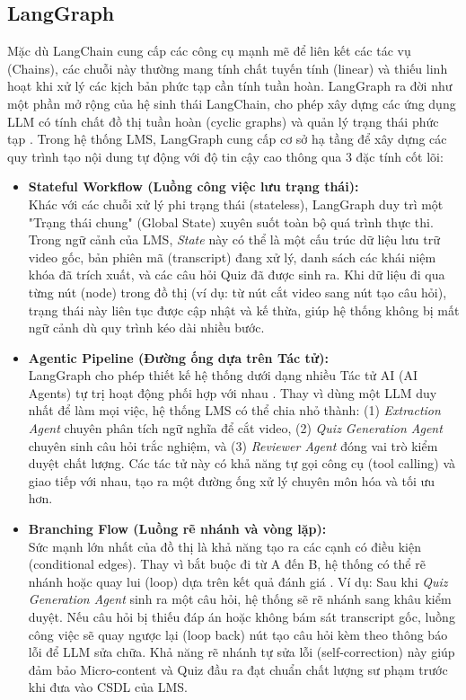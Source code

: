 \subsection{LangGraph}
Mặc dù LangChain cung cấp các công cụ mạnh mẽ để liên kết các tác vụ (Chains), các chuỗi này thường mang tính chất tuyến tính (linear) và thiếu linh hoạt khi xử lý các kịch bản phức tạp cần tính tuần hoàn. LangGraph ra đời như một phần mở rộng của hệ sinh thái LangChain, cho phép xây dựng các ứng dụng LLM có tính chất đồ thị tuần hoàn (cyclic graphs) và quản lý trạng thái phức tạp \cite{langgraph2024}. Trong hệ thống LMS, LangGraph cung cấp cơ sở hạ tầng để xây dựng các quy trình tạo nội dung tự động với độ tin cậy cao thông qua 3 đặc tính cốt lõi:

\begin{itemize}
    \item[\textbf{a.}] \textbf{Stateful Workflow (Luồng công việc lưu trạng thái):} \\
    Khác với các chuỗi xử lý phi trạng thái (stateless), LangGraph duy trì một "Trạng thái chung" (Global State) xuyên suốt toàn bộ quá trình thực thi. Trong ngữ cảnh của LMS, \textit{State} này có thể là một cấu trúc dữ liệu lưu trữ video gốc, bản phiên mã (transcript) đang xử lý, danh sách các khái niệm khóa đã trích xuất, và các câu hỏi Quiz đã được sinh ra. Khi dữ liệu đi qua từng nút (node) trong đồ thị (ví dụ: từ nút cắt video sang nút tạo câu hỏi), trạng thái này liên tục được cập nhật và kế thừa, giúp hệ thống không bị mất ngữ cảnh dù quy trình kéo dài nhiều bước.
    
    \item[\textbf{b.}] \textbf{Agentic Pipeline (Đường ống dựa trên Tác tử):} \\
    LangGraph cho phép thiết kế hệ thống dưới dạng nhiều Tác tử AI (AI Agents) tự trị hoạt động phối hợp với nhau \cite{wang2023survey}. Thay vì dùng một LLM duy nhất để làm mọi việc, hệ thống LMS có thể chia nhỏ thành: (1) \textit{Extraction Agent} chuyên phân tích ngữ nghĩa để cắt video, (2) \textit{Quiz Generation Agent} chuyên sinh câu hỏi trắc nghiệm, và (3) \textit{Reviewer Agent} đóng vai trò kiểm duyệt chất lượng. Các tác tử này có khả năng tự gọi công cụ (tool calling) và giao tiếp với nhau, tạo ra một đường ống xử lý chuyên môn hóa và tối ưu hơn.
    
    \item[\textbf{c.}] \textbf{Branching Flow (Luồng rẽ nhánh và vòng lặp):} \\
    Sức mạnh lớn nhất của đồ thị là khả năng tạo ra các cạnh có điều kiện (conditional edges). Thay vì bắt buộc đi từ A đến B, hệ thống có thể rẽ nhánh hoặc quay lui (loop) dựa trên kết quả đánh giá \cite{wei2022chain}. Ví dụ: Sau khi \textit{Quiz Generation Agent} sinh ra một câu hỏi, hệ thống sẽ rẽ nhánh sang khâu kiểm duyệt. Nếu câu hỏi bị thiếu đáp án hoặc không bám sát transcript gốc, luồng công việc sẽ quay ngược lại (loop back) nút tạo câu hỏi kèm theo thông báo lỗi để LLM sửa chữa. Khả năng rẽ nhánh tự sửa lỗi (self-correction) này giúp đảm bảo Micro-content và Quiz đầu ra đạt chuẩn chất lượng sư phạm trước khi đưa vào CSDL của LMS.
\end{itemize}

